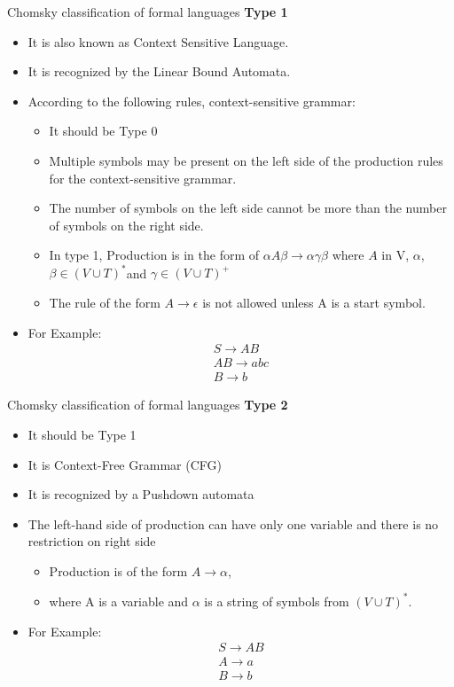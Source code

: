 \documentclass{beamer}
\begin{document}
\begin{frame}{Chomsky classification of formal languages}
	\textbf{Type 1}
	\begin{itemize}
		\item It is also known as Context Sensitive Language.
		 \item It is recognized by the Linear Bound Automata.
		 \item According to the following rules, context-sensitive grammar:
		 \begin{itemize}
		 	\item It should be Type 0
		 	\item Multiple symbols may be present on the left side of the production rules for the context-sensitive grammar.
		 	\item The number of symbols on the left side cannot be more than the number of symbols on the right side.
		 	\item In type 1, Production is in the form of $\alpha A \beta \rightarrow \alpha \gamma \beta$ where $A$ in V, $\alpha$, $\beta \in (V\cup T)^*$and $\gamma \in  (V \cup T)^+$
		 	\item The rule of the form $A \rightarrow \epsilon$ is not allowed unless A is a start symbol.
		 \end{itemize}
	 \item For Example:
	 \begin{eqnarray*}
	 	S \rightarrow AB \\
	 	AB \rightarrow abc \\
	 	B \rightarrow b
	 \end{eqnarray*}
	\end{itemize}
	
\end{frame}
\begin{frame}{Chomsky classification of formal languages}
	\textbf{Type 2}
	\begin{itemize}
		\item It should be Type 1
		\item It is Context-Free Grammar (CFG)
		\item It is recognized by a Pushdown automata
		\item The left-hand side of production can have only one variable and there is no restriction on right side
		\begin{itemize}
			\item  Production is of the form $A \rightarrow \alpha$,
			\item where A is a variable and $\alpha$ is a string of symbols from $(V \cup T)^*$.
		\end{itemize}
		\item For Example:
		\begin{eqnarray*}
		S \rightarrow AB \\
		A \rightarrow a \\
		B \rightarrow b
		\end{eqnarray*}
	\end{itemize}
	
\end{frame}
\end{document}
